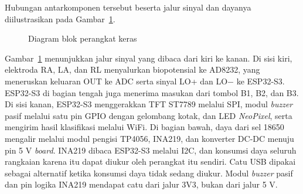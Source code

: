 Hubungan antarkomponen tersebut beserta jalur sinyal dan dayanya diilustrasikan pada Gambar~\ref{fig:blok-perangkat-keras}.

\begin{figure}[H]
  \centering
  \caption{Diagram blok perangkat keras}
  \label{fig:blok-perangkat-keras}
\end{figure}

Gambar~\ref{fig:blok-perangkat-keras} menunjukkan jalur sinyal yang dibaca dari kiri ke kanan. Di sisi kiri, elektroda RA, LA, dan RL menyalurkan biopotensial ke AD8232, yang meneruskan keluaran OUT ke ADC serta sinyal LO+ dan LO$-$ ke ESP32-S3. ESP32-S3 di bagian tengah juga menerima masukan dari tombol B1, B2, dan B3. Di sisi kanan, ESP32-S3 menggerakkan TFT ST7789 melalui SPI, modul \textit{buzzer} pasif melalui satu pin GPIO dengan gelombang kotak, dan LED \textit{NeoPixel}, serta mengirim hasil klasifikasi melalui WiFi. Di bagian bawah, daya dari sel 18650 mengalir melalui modul pengisi TP4056, INA219, dan konverter DC-DC menuju pin 5 V \textit{board}. INA219 dibaca ESP32-S3 melalui I2C, dan konsumsi daya seluruh rangkaian karena itu dapat diukur oleh perangkat itu sendiri. Catu USB dipakai sebagai alternatif ketika konsumsi daya tidak sedang diukur. Modul \textit{buzzer} pasif dan pin logika INA219 mendapat catu dari jalur 3V3, bukan dari jalur 5 V.

